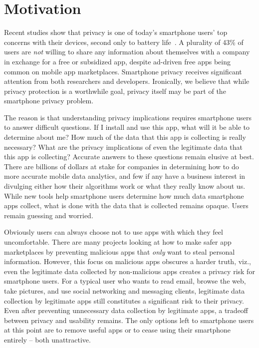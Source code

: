 
\section{Motivation}
\label{sec-motivation}

Recent studies show that privacy is one of today's smartphone users' top
concerns with their devices, second only to battery
life~\cite{truste-privacy}. A plurality of 43\% of users are \textit{not}
willing to share any information about themselves with a company in exchange
for a free or subsidized app, despite ad-driven free apps being common on
mobile app marketplaces. Smartphone privacy receives significant attention
from both researchers and developers.  Ironically, we believe that while
privacy protection is a worthwhile goal, privacy itself may be part of the
smartphone privacy problem.

The reason is that understanding privacy implications requires smartphone
users to answer difficult questions. If I install and use this app, what will it
be able to determine about me? How much of the data that this app is
collecting is really necessary? What are the privacy implications of even the
legitimate data that this app is collecting? Accurate answers to these
questions remain elusive at best. There are billions of dollars at stake for
companies in determining how to do more accurate mobile data analytics, and
few if any have a business interest in divulging either how their algorithms
work or what they really know about us. While new tools help smartphone users
determine how much data smartphone apps collect, what is done with the data
that is collected remains opaque. Users remain guessing and worried.

Obviously users can always choose not to use apps with which they feel
uncomfortable.  There are many projects looking at how to make safer
app marketplaces by preventing malicious apps that \textit{only} want to
steal personal information.  However, this focus on malicious apps obscures a
harder truth, viz., even the legitimate data collected by non-malicious apps
creates a privacy risk for smartphone users. For a typical user who wants to
read email, browse the web, take pictures, and use social networking
and messaging clients, legitimate data collection by legitimate apps still
constitutes a significant risk to their privacy. Even after preventing
unnecessary data collection by legitimate apps, a tradeoff between privacy
and usability remains. The only options left to smartphone users at this point
are to remove useful apps or to cease using their smartphone entirely -- both
unattractive.

